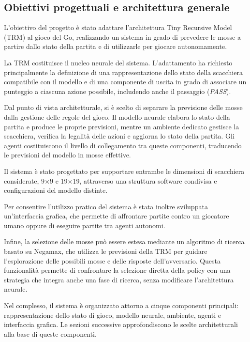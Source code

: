 \subsection{Obiettivi progettuali e architettura generale}

L'obiettivo del progetto è stato adattare l'architettura Tiny Recursive Model (TRM) al gioco del Go, realizzando un sistema in grado di prevedere le mosse a partire dallo stato della partita e di utilizzarle per giocare autonomamente.

La TRM costituisce il nucleo neurale del sistema. L'adattamento ha richiesto principalmente la definizione di una rappresentazione dello stato della scacchiera compatibile con il modello e di una componente di uscita in grado di associare un punteggio a ciascuna azione possibile, includendo anche il passaggio (\textit{PASS}).

Dal punto di vista architetturale, si è scelto di separare la previsione delle mosse dalla gestione delle regole del gioco. Il modello neurale elabora lo stato della partita e produce le proprie previsioni, mentre un ambiente dedicato gestisce la scacchiera, verifica la legalità delle azioni e aggiorna lo stato della partita. Gli agenti costituiscono il livello di collegamento tra queste componenti, traducendo le previsioni del modello in mosse effettive.

Il sistema è stato progettato per supportare entrambe le dimensioni di scacchiera considerate, 9$\times$9 e 19$\times$19, attraverso una struttura software condivisa e configurazioni del modello distinte.

Per consentire l'utilizzo pratico del sistema è stata inoltre sviluppata un'interfaccia grafica, che permette di affrontare partite contro un giocatore umano oppure di eseguire partite tra agenti autonomi.

Infine, la selezione delle mosse può essere estesa mediante un algoritmo di ricerca basato su Negamax, che utilizza le previsioni della TRM per guidare l'esplorazione delle possibili mosse e delle risposte dell'avversario. Questa funzionalità permette di confrontare la selezione diretta della policy con una strategia che integra anche una fase di ricerca, senza modificare l'architettura neurale.

Nel complesso, il sistema è organizzato attorno a cinque componenti principali: rappresentazione dello stato di gioco, modello neurale, ambiente, agenti e interfaccia grafica. Le sezioni successive approfondiscono le scelte architetturali alla base di queste componenti.
